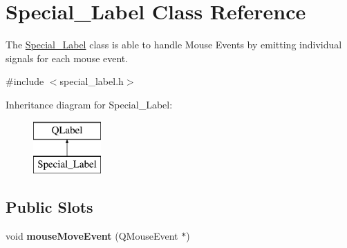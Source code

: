 \hypertarget{class_special___label}{}\section{Special\+\_\+\+Label Class Reference}
\label{class_special___label}


The \hyperlink{class_special___label}{Special\+\_\+\+Label} class is able to handle Mouse Events by emitting individual signals for each mouse event.  




{\ttfamily \#include $<$special\+\_\+label.\+h$>$}

Inheritance diagram for Special\+\_\+\+Label\+:\begin{figure}[H]
\begin{center}
\leavevmode
\includegraphics[height=2.000000cm]{class_special___label}
\end{center}
\end{figure}
\subsection*{Public Slots}
\begin{DoxyCompactItemize}
\item 
\hypertarget{class_special___label_a8d6f52208b95cf7479801d6a897ab381}{}void {\bfseries mouse\+Move\+Event} (Q\+Mouse\+Event $\ast$)\label{class_special___label_a8d6f52208b95cf7479801d6a897ab381}

\end{DoxyCompactItemize}
